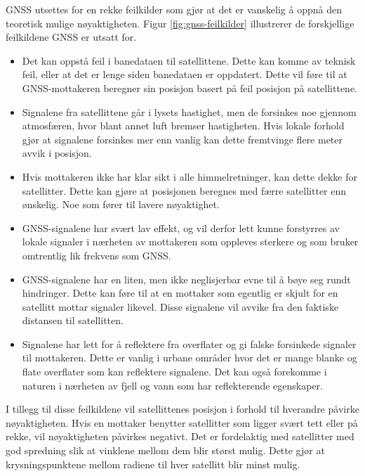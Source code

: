 GNSS utsettes for en rekke feilkilder som gjør at det er vanskelig å oppnå den teoretisk mulige nøyaktigheten. 
Figur \ref{fig:gnss-feilkilder} illustrerer de forskjellige feilkildene GNSS er utsatt for.

\begin{itemize}
\item Det kan oppstå feil i banedataen til satellittene. Dette kan komme av teknisk feil, eller at det er lenge siden banedataen er oppdatert. Dette vil føre til at GNSS-mottakeren beregner sin posisjon basert på feil posisjon på satellittene.
\item Signalene fra satellittene går i lysets hastighet, men de forsinkes noe gjennom atmosfæren, hvor blant annet luft bremser hastigheten. Hvis lokale forhold gjør at signalene forsinkes mer enn vanlig kan dette fremtvinge flere meter avvik i posisjon.
\item Hvis mottakeren ikke har klar sikt i alle himmelretninger, kan dette dekke for satellitter. Dette kan gjøre at posisjonen beregnes med færre satellitter enn ønskelig. Noe som fører til lavere nøyaktighet.
\item GNSS-signalene har svært lav effekt, og vil derfor lett kunne forstyrres av lokale signaler i nærheten av mottakeren som oppleves sterkere og som bruker omtrentlig lik frekvens som GNSS.
\item GNSS-signalene har en liten, men ikke neglisjerbar evne til å bøye seg rundt hindringer. Dette kan føre til at en mottaker som egentlig er skjult for en satellitt mottar signaler likevel. Disse signalene vil avvike fra den faktiske distansen til satellitten.
\item Signalene har lett for å reflektere fra overflater og gi falske forsinkede signaler til mottakeren. Dette er vanlig i urbane områder hvor det er mange blanke og flate overflater som kan reflektere signalene. Det kan også forekomme i naturen i nærheten av fjell og vann som har reflekterende egenskaper. \parencite{NorskRomsenter} 
\end{itemize}

I tillegg til disse feilkildene vil satellittenes posisjon i forhold til hverandre påvirke nøyaktigheten. 
Hvis en mottaker benytter satellitter som ligger svært tett eller på rekke, vil nøyaktigheten påvirkes negativt. 
Det er fordelaktig med satellitter med god spredning slik at vinklene mellom dem blir størst mulig. 
Dette gjør at krysningspunktene mellom radiene til hver satellitt blir minst mulig. \parencite{NorskRomsenter}